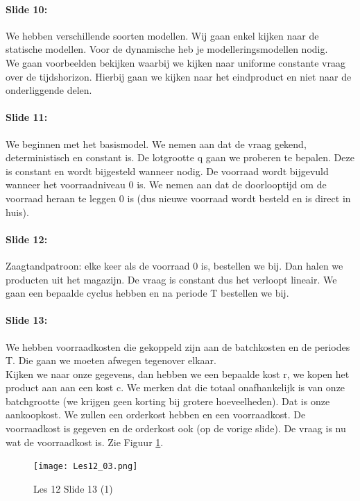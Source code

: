 \documentclass[10pt,a4paper]{report}
\begin{document}
\paragraph{Slide 10:} We hebben verschillende soorten modellen. Wij gaan enkel kijken naar de statische modellen. Voor de dynamische heb je modelleringsmodellen nodig.\\
We gaan voorbeelden bekijken waarbij we kijken naar uniforme constante vraag over de tijdshorizon. Hierbij gaan we kijken naar het eindproduct en niet naar de onderliggende delen. %

\paragraph{Slide 11:} We beginnen met het basismodel. We nemen aan dat de vraag gekend, deterministisch en constant is. De lotgrootte q gaan we proberen te bepalen. Deze is constant en wordt bijgesteld wanneer nodig. De voorraad wordt bijgevuld wanneer het voorraadniveau 0 is. We nemen aan dat de doorlooptijd om de voorraad heraan te leggen 0 is (dus nieuwe voorraad wordt besteld en is direct in huis).

\paragraph{Slide 12:} Zaagtandpatroon: elke keer als de voorraad 0 is, bestellen we bij. Dan halen we producten uit het magazijn. De vraag is constant dus het verloopt lineair. We gaan een bepaalde cyclus hebben en na periode T bestellen we bij.

\paragraph{Slide 13:} We hebben voorraadkosten die gekoppeld zijn aan de batchkosten en de periodes T. Die gaan we moeten afwegen tegenover elkaar.\\ 
Kijken we naar onze gegevens, dan hebben we een bepaalde kost r, we kopen het product aan aan een kost c. We merken dat die totaal onafhankelijk is van onze batchgrootte (we krijgen geen korting bij grotere hoeveelheden). Dat is onze aankoopkost. We zullen een orderkost hebben en een voorraadkost. De voorraadkost is gegeven en de orderkost ook (op de vorige slide). De vraag is nu wat de voorraadkost is. Zie Figuur \ref{les12_03}.\\

\begin{figure}[h!]
\centering
\texttt{[image: Les12\_03.png]}
\caption{Les 12 Slide 13 (1)} 
\label{les12_03}
\end{figure}
\end{document}
